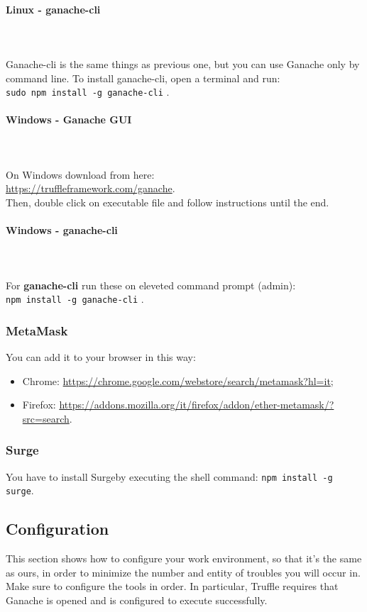 \paragraph{Linux - ganache-cli} \mbox{} \\ \mbox{} \\
Ganache-cli is the same things as previous one, but you can use Ganache only by command line.
To install ganache-cli, open a terminal and run: \\ \texttt{sudo npm install -g ganache-cli} .
\paragraph{Windows - Ganache GUI} \mbox{} \\ \mbox{} \\
On Windows download from here: \\
\url{https://truffleframework.com/ganache}. \\
Then, double click on executable file and follow instructions until the end.
\paragraph{Windows - ganache-cli} \mbox{} \\ \mbox{} \\ 
For \textbf{ganache-cli} run these on eleveted command prompt (admin):\\
\texttt{npm install -g ganache-cli} .
\subsubsection{MetaMask}
You can add it to your browser in this way:
\begin{itemize}
	\item Chrome:  \href{https://chrome.google.com/webstore/search/metamask?hl=it}{https://chrome.google.com/webstore/search/metamask?hl=it};
	\item Firefox: \href{https://addons.mozilla.org/it/firefox/addon/ether-metamask/?src=search}{https://addons.mozilla.org/it/firefox/addon/ether-metamask/?src=search}.
\end{itemize}


\subsubsection{Surge}
You have to install Surge\glosp by executing the shell command: \texttt{npm install -g surge}.


\subsection{Configuration}
This section shows how to configure your work environment, so that it's the same as ours, in order to minimize the number and entity of troubles you will occur in.\\
Make sure to configure the tools in order. In particular, Truffle requires that Ganache is opened and is configured to execute successfully.
